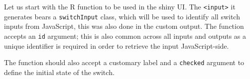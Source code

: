 \documentclass[
]{krantz}
\makeatletter
\newenvironment{Shaded}{\begin{snugshade}}{\end{snugshade}}
\newcommand{\CommentTok}[1]{\textcolor[rgb]{0.37,0.37,0.37}{\textit{#1}}}
\newcommand{\ControlFlowTok}[1]{\textcolor[rgb]{0.27,0.27,0.27}{\textbf{#1}}}
\newcommand{\DataTypeTok}[1]{\textcolor[rgb]{0.27,0.27,0.27}{#1}}
\newcommand{\KeywordTok}[1]{\textcolor[rgb]{0.27,0.27,0.27}{\textbf{#1}}}
\newcommand{\NormalTok}[1]{#1}
\newcommand{\OperatorTok}[1]{\textcolor[rgb]{0.43,0.43,0.43}{\textbf{#1}}}
\newcommand{\OtherTok}[1]{\textcolor[rgb]{0.37,0.37,0.37}{#1}}
\newcommand{\StringTok}[1]{\textcolor[rgb]{0.5,0.5,0.5}{#1}}
\newenvironment{kframe}{%
\medskip{}
\setlength{\fboxsep}{.8em}
 \def\at@end@of@kframe{}%
 \ifinner\ifhmode%
  \def\at@end@of@kframe{\end{minipage}}%
  \begin{minipage}{\columnwidth}%
 \fi\fi%
 \def\FrameCommand##1{\hskip\@totalleftmargin \hskip-\fboxsep
 \colorbox{shadecolor}{##1}\hskip-\fboxsep
     \hskip-\linewidth \hskip-\@totalleftmargin \hskip\columnwidth}%
 \MakeFramed {\advance\hsize-\width
   \@totalleftmargin\z@ \linewidth\hsize
   \@setminipage}}%
 {\par\unskip\endMakeFramed%
 \at@end@of@kframe}
\renewenvironment{Shaded}{\begin{kframe}}{\end{kframe}}
\makeatother
\begin{document}
Let us start with the R function to be used in the shiny UI. The \texttt{\textless{}input\textgreater{}} it generates bears a \texttt{switchInput} class, which will be used to identify all switch inputs from JavaScript, this was also done in the custom output. The function accepts an \texttt{id} argument; this is also common across all inputs and outputs as a unique identifier is required in order to retrieve the input JavaScript-side.

\begin{Shaded}
\end{Shaded}

The function should also accept a customary label and a \texttt{checked} argument to define the initial state of the switch.

\begin{Shaded}
\end{Shaded}
\end{document}
